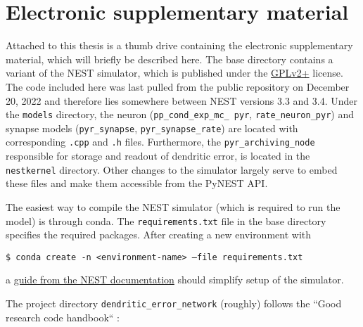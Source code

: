 \newpage
\section{Electronic supplementary material}

Attached to this thesis is a thumb drive containing the electronic supplementary material, which will briefly be
described here. The base directory contains a variant of the NEST simulator, which is published under the
\href{https://www.gnu.org/licenses/old-licenses/gpl-2.0.html}{GPLv2+} license. The code included here was last pulled
from the public repository on December 20, 2022 and therefore lies somewhere between NEST versions 3.3 and 3.4. Under
the \texttt{models} directory, the neuron (\texttt{pp\_\allowbreak cond\_\allowbreak exp\_\allowbreak mc\_\allowbreak
pyr}, \texttt{rate\_\allowbreak neuron\_\allowbreak pyr}) and synapse models (\texttt{pyr\_\allowbreak synapse},
\texttt{pyr\_\allowbreak synapse\_\allowbreak rate}) are located with corresponding \texttt{.cpp} and \texttt{.h} files.
Furthermore, the \texttt{pyr\_\allowbreak archiving\_\allowbreak node} responsible for storage and readout of dendritic
error, is located in the \texttt{nestkernel} directory. Other changes to the simulator largely serve to embed these
files and make them accessible from the PyNEST API.

The easiest way to compile the NEST simulator (which is required to run the model) is through conda. The
\texttt{requirements.txt} file in the base directory specifies the required packages. After creating a new environment
with\newline

\texttt{\$ conda create -n <environment-name> --file requirements.txt}\newline

a \href{https://nest-simulator.readthedocs.io/en/v3.4/installation/condaenv_install.html#condaenv}{guide from the NEST
  documentation} should simplify setup of the simulator.

The project directory \texttt{dendritic\_\allowbreak error\_\allowbreak network} (roughly) follows the ``Good research
code handbook`` \citep{Mineault2021}:

